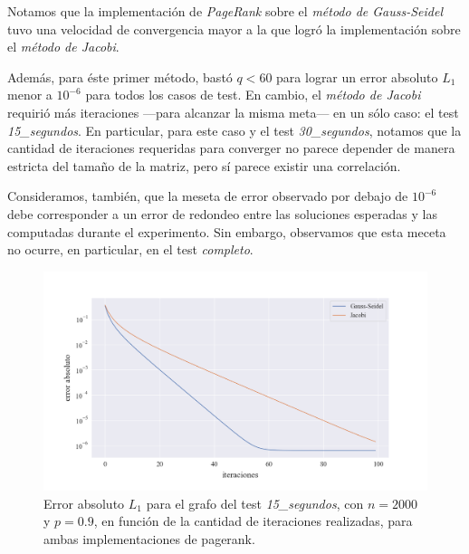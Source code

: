 \vspace{1em}
Notamos que la implementación de \textit{PageRank} sobre el \textit{método de Gauss-Seidel} tuvo una velocidad de convergencia mayor a la que logró la implementación sobre el \textit{método de Jacobi}. 

\vspace{1em}
Además, para éste primer método, bastó $q < 60$ para lograr un error absoluto $L_1$ menor a $10^{-6}$ para todos los casos de test. En cambio, el \textit{método de Jacobi} requirió más iteraciones ---para alcanzar la misma meta--- en un sólo caso: el test \textit{15\_segundos}. En particular, para este caso y el test \textit{30\_segundos}, notamos que la cantidad de iteraciones requeridas para converger no parece depender de manera estricta del tamaño de la matriz, pero sí parece existir una correlación.

\vspace{1em}
Consideramos, también, que la meseta de error observado por debajo de $10^{-6}$ debe corresponder a un error de redondeo entre las soluciones esperadas y las computadas durante el experimento. Sin embargo, observamos que esta meceta no ocurre, en particular, en el test \textit{completo}.


\begin{figure}[!htbp]
    \centering
    \includegraphics[width=1\textwidth, trim=0 0 0 30]{files/src/.media/convergencia_test_15_segundos.png}
    \caption{Error absoluto $L_1$ para el grafo del test \textit{15\_segundos}, con $n = 2000$ y $p = 0.9$, en función de la cantidad de iteraciones realizadas, para ambas implementaciones de pagerank.} \label{test_15_segundos}
\end{figure}


